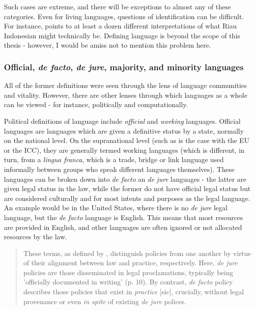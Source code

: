 Such cases are extreme, and there will be exceptions to almost any of these categories. Even for living languages, questions of identification can be difficult. For instance, \cite{gilRiau} points to at least a dozen different interpretations of what Riau Indonesian might technically be. Defining language is beyond the scope of this thesis - however, I would be amiss not to mention this problem here.

\subsubsection{Official, \textit{de facto}, \textit{de jure}, majority, and minority languages}

All of the former definitions were seen through the lens of language communities and vitality. However, there are other lenses through which languages as a whole can be viewed - for instance, politically and computationally.

Political definitions of language include \textit{official} and \textit{working} languages. Official languages are languages which are given a definitive status by a state, normally on the national level. On the supranational level (such as is the case with the EU or the ICC), they are generally termed working languages (which is different, in turn, from a \textit{lingua franca}, which is a trade, bridge or link language used informally between groups who speak different languages themselves). These languages can be broken down into {\it de facto} an {\it de jure} languages - the latter are given legal status in the law, while the former do not have official legal status but are considered culturally and for most intents and purposes as the legal language. An example would be in the United States, where there is no {\it de jure} legal language, but the {\it de facto} language is English. This means that most resources are provided in English, and other languages are often ignored or not allocated resources by the law.

\begin{quote}
These terms, as defined by \citet{johnson2013language}, distinguish policies from one another by virtue of their alignment between law and practice, respectively. Here, {\it de jure} policies are those disseminated in legal proclamations, typically being 'officially documented in writing' (p. 10). By contrast, {\it de facto} policy describes those policies that exist in {\it practice} [sic], crucially, without legal provenance or even {\it in spite} of existing \textit{de jure} polices. \citep{hanks2017policy}
\end{quote}

